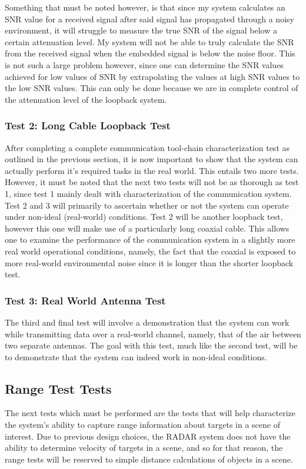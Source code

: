 \documentclass[11pt]{report}
\begin{document}
Something that must be noted however, is that since my system calculates an SNR value for a received signal after said signal has propagated through a noisy environment, it will struggle to measure the true SNR of the signal below a certain attenuation level. My system will not be able to truly calculate the SNR from the received signal when the embedded signal is below the noise floor. This is not such a large problem however, since one can determine the SNR values achieved for low values of SNR by extrapolating the values at high SNR values to the low SNR values. This can only be done because we are in complete control of the attenuation level of the loopback system.

\subsubsection{Test 2: Long Cable Loopback Test}
After completing a complete communication tool-chain characterization test as outlined in the previous section, it is now important to show that the system can actually perform it's required tasks in the real world. This entails two more tests. However, it must be noted that the next two tests will not be as thorough as test 1, since test 1 mainly dealt with characterization of the communication system. Test 2 and 3 will primarily to ascertain whether or not the system can operate under non-ideal (real-world) conditions. Test 2 will be another loopback test, however this one will make use of a particularly long coaxial cable. This allows one to examine the performance of the communication system in a slightly more real world operational conditions, namely, the fact that the coaxial is exposed to more real-world environmental noise since it is longer than the shorter loopback test.

\subsubsection{Test 3: Real World Antenna Test}
The third and final test will involve a demonstration that the system can work while transmitting data over a real-world channel, namely, that of the air between two separate antennas. The goal with this test, much like the second test, will be to demonstrate that the system can indeed work in non-ideal conditions.




\subsection{Range Test Tests}
The next tests which must be performed are the tests that will help characterize the system's ability to capture range information about targets in a scene of interest. Due to previous design choices, the RADAR system does not have the ability to determine velocity of targets in a scene, and so for that reason, the range tests will be reserved to simple distance calculations of objects in a scene.
\end{document}
